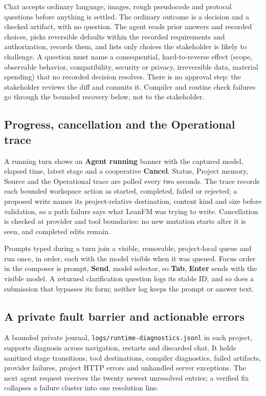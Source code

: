 Chat accepts ordinary language, images, rough pseudocode and protocol questions
before anything is settled. The ordinary outcome is a decision and a checked
artifact, with no question. The agent reads prior answers and recorded choices,
picks reversible defaults within the recorded requirements and authorization,
records them, and lists only choices the stakeholder is likely to challenge. A
question must name a consequential, hard-to-reverse effect (scope, observable
behavior, compatibility, security or privacy, irreversible data, material
spending) that no recorded decision resolves. There is no approval step: the
stakeholder reviews the diff and commits it. Compiler and routine check failures
go through the bounded recovery below, not to the stakeholder.

\subsection{Progress, cancellation and the Operational trace}

A running turn shows an \textbf{Agent running} banner with the captured model,
elapsed time, latest stage and a cooperative \textbf{Cancel}. Status, Project
memory, Source and the Operational trace are polled every two seconds. The trace
records each bounded workspace action as started, completed, failed or rejected;
a proposed write names its project-relative destination, content kind and size
before validation, so a path failure says what LeanFM was trying to write.
Cancellation is checked at provider and tool boundaries: no new mutation starts
after it is seen, and completed edits remain.

Prompts typed during a turn join a visible, removable, project-local queue and
run once, in order, each with the model visible when it was queued. Focus order
in the composer is prompt, \textbf{Send}, model selector, so \textbf{Tab},
\textbf{Enter} sends with the visible model. A returned clarification question
logs its stable ID, and so does a submission that bypasses its form; neither log
keeps the prompt or answer text.

\subsection{A private fault barrier and actionable errors}

A bounded private journal, \texttt{logs/runtime-diagnostics.jsonl} in each
project, supports diagnosis across navigation, restarts and discarded chat. It
holds sanitized stage transitions, tool destinations, compiler diagnostics,
failed artifacts, provider failures, project HTTP errors and unhandled server
exceptions. The next agent request receives the twenty newest unresolved entries;
a verified fix collapses a failure cluster into one resolution line.

